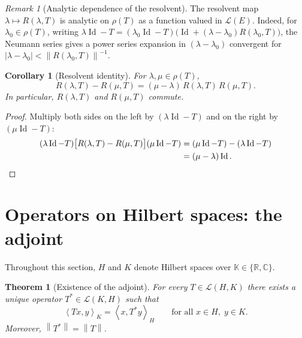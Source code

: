 \documentclass[a4paper,12pt]{book}
\DeclareMathOperator{\Id}{Id}
\newcommand{\R}{\mathbb{R}}
\newcommand{\C}{\mathbb{C}}
\newcommand{\K}{\mathbb{K}}
\newcommand{\norm}[1]{\left\| #1 \right\|}
\newcommand{\abs}[1]{\left| #1 \right|}
\newcommand{\inner}[2]{\left\langle #1, #2 \right\rangle}
\theoremstyle{definition}
\theoremstyle{plain}
\newtheorem{theorem}[definition]{Theorem}
\newtheorem{corollary}[definition]{Corollary}
\theoremstyle{remark}
\newtheorem{remark}[definition]{Remark}
\begin{document}
\begin{remark}[Analytic dependence of the resolvent]\label{rem:resolvent-analytic}
The resolvent map $\lambda\mapsto R(\lambda,T)$ is analytic on $\rho(T)$ as a
function valued in $\mathcal{L}(E)$. Indeed, for $\lambda_0\in\rho(T)$, writing
$\lambda\Id-T = (\lambda_0\Id-T)\bigl(\Id+(\lambda-\lambda_0)R(\lambda_0,T)\bigr)$,
the Neumann series gives a power series expansion in $(\lambda-\lambda_0)$
convergent for $\abs{\lambda-\lambda_0}<\norm{R(\lambda_0,T)}^{-1}$.
\end{remark}

\begin{corollary}[Resolvent identity]\label{cor:resolvent-identity}
For $\lambda,\mu\in\rho(T)$,
\[
  R(\lambda,T) - R(\mu,T) = (\mu-\lambda)\,R(\lambda,T)\,R(\mu,T).
\]
In particular, $R(\lambda,T)$ and $R(\mu,T)$ commute.
\end{corollary}

\begin{proof}
Multiply both sides on the left by $(\lambda\Id-T)$ and on the right by
$(\mu\Id-T)$:
\begin{align*}
  (\lambda\Id-T)\bigl[R(\lambda,T)-R(\mu,T)\bigr](\mu\Id-T)
  &= (\mu\Id-T) - (\lambda\Id-T) \\
  &= (\mu-\lambda)\Id. \qedhere
\end{align*}
\end{proof}

\section{Operators on Hilbert spaces: the adjoint}

Throughout this section, $H$ and $K$ denote Hilbert spaces over $\K\in\{\R,\C\}$.

\begin{theorem}[Existence of the adjoint]\label{thm:adjoint-existence}
For every $T\in\mathcal{L}(H,K)$ there exists a unique operator
$T^*\in\mathcal{L}(K,H)$ such that
\[
  \inner{Tx}{y}_K = \inner{x}{T^*y}_H
  \qquad\text{for all } x\in H,\; y\in K.
\]
Moreover, $\norm{T^*}=\norm{T}$.
\end{theorem}
\end{document}
